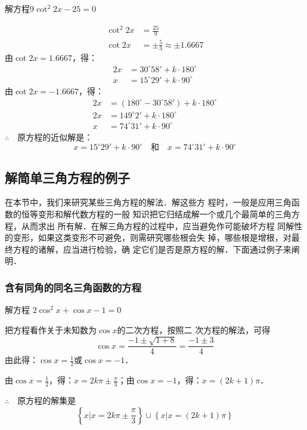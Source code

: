 \begin{example}
    解方程$9\cot^2 2x-25=0$
\end{example}

\begin{solution}
    \[\begin{split}
        \cot^2 2x&=\frac{25}{9}\\
        \cot 2x&=\pm\frac{5}{3}\approx \pm 1.6667
    \end{split}\]
由$\cot 2x=1.6667$，得：
\[\begin{split}
    2x&=30^{\circ}58'+k\cdot 180^{\circ}\\
    x&=15^{\circ}29'+k\cdot 90^{\circ}
\end{split}\]
由$\cot 2x=-1.6667$，得：
\[\begin{split}
    2x&=(180^{\circ}-30^{\circ}58')+k\cdot 180^{\circ}\\
    2x&=149^{\circ}2'+k\cdot 180^{\circ}\\
    x&=74^{\circ}31'+k\cdot 90^{\circ}
\end{split}\]
$\therefore\quad $原方程的近似解是：
\[x=15^{\circ}29'+k\cdot 90^{\circ}\quad \text{和}\quad x=74^{\circ}31'+k\cdot 90^{\circ}\]
\end{solution}

\subsection{解简单三角方程的例子}
在本节中，我们来研究某些三角方程的解法．解这些方
程时，一般是应用三角函数的恒等变形和解代数方程的一般
知识把它归结成解一个或几个最简单的三角方程，从而求出
所有解．在解三角方程的过程中，应当避免作可能破坏方程
同解性的变形，如果这类变形不可避免，则需研究哪些根会失
掉，哪些根是增根，对最终方程的诸解，应当进行检验，确
定它们是否是原方程的解．下面通过例子来阐明．

\subsubsection{含有同角的同名三角函数的方程}
\begin{example}
    解方程
 $   2\cos^2x+\cos x-1=0$
\end{example}

\begin{solution}
    把方程看作关于未知数为$\cos x$的二次方程，按照二
次方程的解法，可得
\[\cos x=\frac{-1\pm\sqrt{1+8}}{4}=\frac{-1\pm 3}{4}\]
由此得：$\cos x=\frac{1}{2}$或$\cos x=-1$．

由$\cos x=\frac{1}{2}$，得：$x=2k\pi\pm\frac{\pi}{3}$；由$\cos x=-1$，得：$x=(2k+1)\pi$．

$\therefore\quad $原方程的解集是
\[\left\{x\big| x=2k\pi\pm \frac{\pi}{3}\right\}\cup \left\{x\big| x=(2k+1)\pi \right\}\]
\end{solution}


